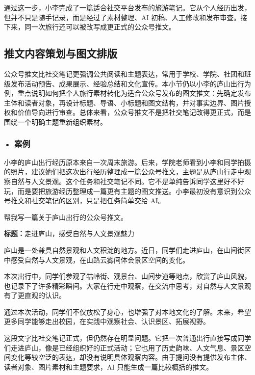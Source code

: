 通过这一步，小李完成了一篇适合社交平台发布的旅游笔记。它从个人经历出发，但并不只是随手记录，而是经过了素材整理、AI 初稿、人工修改和发布审查。接下来，同一次旅行还可以被改写成更正式的公众号推文。

\subsection{推文内容策划与图文排版}

公众号推文比社交笔记更强调公共阅读和主题表达，常用于学校、学院、社团和班级发布活动预告、成果展示、经验总结和文化宣传。本小节仍以小李的庐山出行为例，重点说明如何把个人旅行素材转化为适合公众号发布的图文推文：先确定发布主体和读者对象，再设计标题、导语、小标题和图文结构，并对事实边界、图片授权和价值导向进行审查。总体来看，公众号推文不是把社交笔记改得更正式，而是围绕一个明确主题重新组织素材。


\subsubsection*{\textbf{• 案例}}

小李的庐山出行经历原本来自一次周末旅游。后来，学院老师看到小李和同学拍摄的照片，建议她们把这次出行经历整理成一篇公众号推文，主题是从庐山行走中观察自然与人文景观。这个任务和社交笔记不同。它不是单纯告诉同学这里好不好玩，而是要把旅游经历整理成一篇更有主题的图文推送。小李最初没有意识到公众号推文和社交笔记的区别，只是把任务简单交给 AI。

\begin{userbox}
帮我写一篇关于庐山出行的公众号推文。
\end{userbox}

\begin{aibox}
\textbf{标题：}走进庐山，感受自然与人文景观魅力

庐山是一处兼具自然景观和人文积淀的地方。近日，同学们走进庐山，在山间街区中感受自然与人文景观，在山路云雾间体会景区空间的变化。

本次出行中，同学们参观了牯岭街、观景台、山间步道等地点，欣赏了庐山风貌，也记录下了许多精彩瞬间。大家在行走中观察，在交流中思考，对自然与人文景观有了更直观的认识。

通过本次活动，同学们不仅放松了身心，也增强了对本地文化的了解。未来，希望更多同学能够走出校园，在实践中观察社会、认识景区、拓展视野。
\end{aibox}

这段文字比社交笔记正式，但仍然存在明显问题。它把一次普通出行直接写成同学们走进庐山，像是已经组织好的正式活动；它也用了历史韵味、人文气息、景区空间变化等较空泛的表达，却没有说明具体观察内容。由于提问没有提供发布主体、读者对象、图片素材和主题要求，AI 只能生成一篇比较概括的推文。

